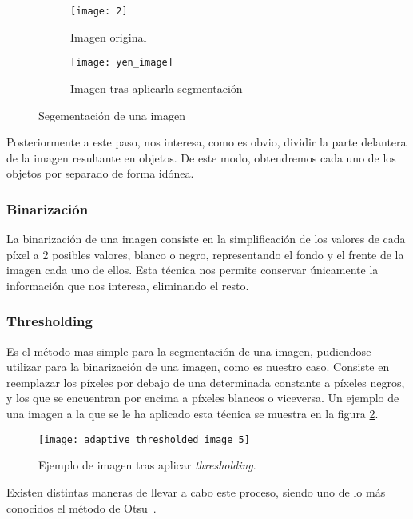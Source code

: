 \begin{figure}
	\centering
	\begin{subfigure}[b]{0.4\textwidth}
        \texttt{[image: 2]}
        \caption{Imagen original}
    \end{subfigure}
    \begin{subfigure}[b]{0.4\textwidth}
        \texttt{[image: yen\_image]}
        \caption{Imagen tras aplicarla segmentación}
    \end{subfigure}
    \caption{Segementación de una imagen}
	\label{fig:3.4.0}
\end{figure}

Posteriormente a este paso, nos interesa, como es obvio, dividir la parte delantera de la imagen resultante en objetos. De este modo, obtendremos cada uno de los objetos por separado de forma idónea.

\subsubsection{Binarización}

La binarización de una imagen consiste en la simplificación de los valores de cada píxel a 2 posibles valores, blanco o negro, representando el fondo y el frente de la imagen cada uno de ellos. Esta técnica nos permite conservar únicamente la información que nos interesa, eliminando el resto.

\subsubsection{Thresholding}

Es el método mas simple para la segmentación de una imagen, pudiendose utilizar para la binarización de una imagen, como es nuestro caso. Consiste en reemplazar los píxeles por debajo de una determinada constante a píxeles negros, y los que se encuentran por encima a píxeles blancos o viceversa. Un ejemplo de una imagen a la que se le ha aplicado esta técnica se muestra en la figura \ref{fig:3.2.1}.

\begin{figure}
\centering
\texttt{[image: adaptive\_thresholded\_image\_5]}
\caption{Ejemplo de imagen tras aplicar \textit{thresholding}.}
\label{fig:3.2.1}
\end{figure}

Existen distintas maneras de llevar a cabo este proceso, siendo uno de lo más conocidos el método de Otsu~\cite{wiki:otsu}.

